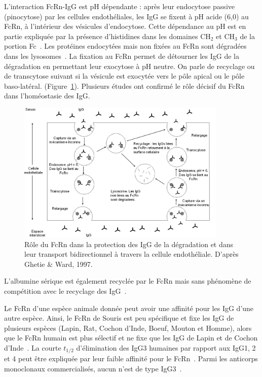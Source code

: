L'interaction FcRn-IgG est pH dépendante : après leur endocytose passive (pinocytose) par les cellules endothéliales, les IgG se fixent à pH acide (6,0) au FcRn, à l'intérieur des vésicules d'endocytose. Cette dépendance au pH est en partie expliquée par la présence d'histidines dans les domaines CH$_2$ et CH$_3$ de la portion Fc~\citep{REF34, REF35}. Les protéines endocytées mais non fixées au FcRn sont dégradées dans les lysosomes~\citep{REF36, REF37}. La fixation au FcRn permet de détourner les IgG de la dégradation en permettant leur exocytose à pH neutre. On parle de recyclage ou de transcytose suivant si la vésicule est exocytée vers le pôle apical ou le pôle baso-latéral. (Figure~\ref{fig:14}). Plusieurs études ont confirmé le rôle décisif du FcRn dans l'homéostasie des IgG.

\begin{figure}[htbp]
	\centering
		\includegraphics[width=10cm]{figures/raster/FIG_14}
	\caption[Rôle du FcRn]{Rôle du FcRn dans la protection des IgG de la dégradation et dans leur transport bidirectionnel à travers la cellule endothéliale. D'après Ghetie \& Ward, 1997.}
	\label{fig:14}
\end{figure}

L'albumine sérique est également recyclée par le FcRn mais sans phénomène de compétition avec le recyclage des IgG~\citep{REF38}.

Le FcRn d'une espèce animale donnée peut avoir une affinité pour les IgG d'une autre espèce. Ainsi, le FcRn de Souris est peu spécifique et fixe les IgG de plusieurs espèces (Lapin, Rat, Cochon d'Inde, Boeuf, Mouton et Homme), alors que le FcRn humain est plus sélectif et ne fixe que les IgG de Lapin et de Cochon d'Inde~\citep{REF36}. La courte $t_{1/2}$ d'élimination des IgG3 humaines par rapport aux IgG1, 2 et 4 peut être expliquée par leur faible affinité pour le FcRn~\citep{REF35}. Parmi les anticorps monoclonaux commercialisés, aucun n'est de type IgG3~\citep{REF39}.

